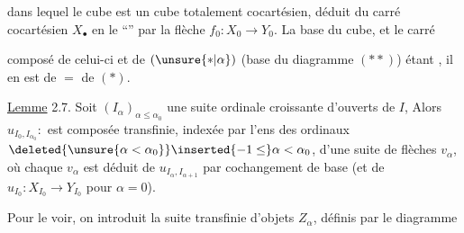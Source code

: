 
dans lequel le cube est un cube totalement cocartésien, déduit du carré cocartésien $X_\bullet$ en le ``'' par la flèche $f_0:X_0\longrightarrow Y_0$. La base du cube, et le carré



composé de celui-ci et de $(\unsure{*|\alpha})$  (base du diagramme  $(**)$) étant , il en est de $=$ de $(*)$.

\uline{Lemme} 2.7. Soit $(I_\alpha)_{\alpha\le\alpha_0}$ une suite ordinale croissante d'ouverts de $I$,  Alors $u_{I_0,I_{\alpha_0}}$$:$ est composée transfinie, indexée par l'ens des ordinaux $\deleted{\unsure{\alpha<\alpha_0}}\inserted{-1\le}\alpha<\alpha_0$, d'une suite de flèches $v_\alpha$, où chaque $v_\alpha$ est déduit de $u_{I_\alpha,I_{\alpha+1}}$ par cochangement de base (et de $u_{I_0}:X_{I_0}\longrightarrow Y_{I_0}$ pour $\alpha=0$).

Pour le voir, on introduit la suite transfinie d'objets $Z_\alpha$, définis par le  diagramme


